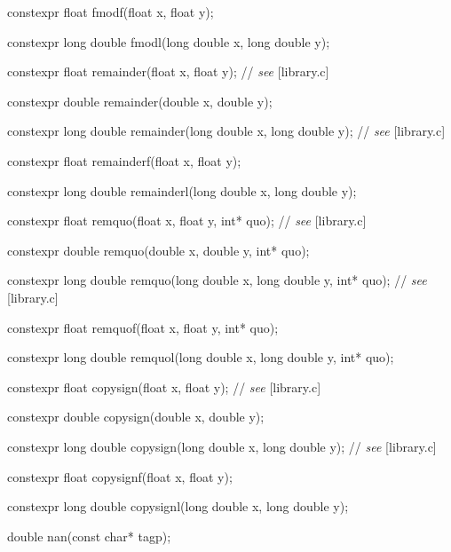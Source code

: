 \documentclass[prd,twocolumn,amsmath,amssymb,nofootinbib,eqsecnum]{revtex4-1}
\newcommand{\oldhighlight}[1]{#1}
\newcommand{\stdcomment}[1]{{// {\it see} [#1]}}
\begin{document}
{\oldhighlight{constexpr} float fmodf(float x, float y);

\oldhighlight{constexpr} long double fmodl(long double x, long double y);

\vspace{2ex}


\oldhighlight{constexpr} float remainder(float x, float y); \stdcomment{library.c}

\oldhighlight{constexpr} double remainder(double x, double y);

\oldhighlight{constexpr} long double remainder(long double x, long double y); \stdcomment{library.c}

\oldhighlight{constexpr} float remainderf(float x, float y);

\oldhighlight{constexpr} long double remainderl(long double x, long double y);

\vspace{2ex}


\oldhighlight{constexpr}  float remquo(float x, float y, int* quo); \stdcomment{library.c}

\oldhighlight{constexpr}  double remquo(double x, double y, int* quo);

\oldhighlight{constexpr}  long double remquo(long double x, long double y, int* quo); \stdcomment{library.c}

\oldhighlight{constexpr}  float remquof(float x, float y, int* quo);

\oldhighlight{constexpr}  long double remquol(long double x, long double y, int* quo);

\vspace{2ex}


\oldhighlight{constexpr} float copysign(float x, float y); \stdcomment{library.c}

\oldhighlight{constexpr} double copysign(double x, double y);

\oldhighlight{constexpr} long double copysign(long double x, long double y); \stdcomment{library.c}

\oldhighlight{constexpr} float copysignf(float x, float y);

\oldhighlight{constexpr} long double copysignl(long double x, long double y);

\vspace{2ex}

double nan(const char* tagp);

}
\end{document}

